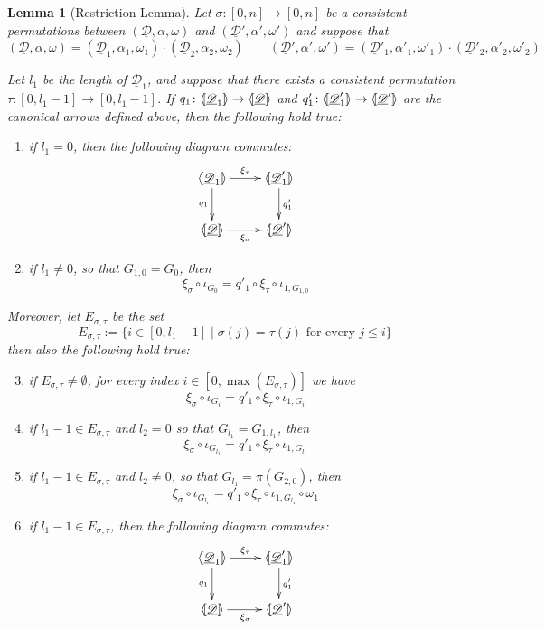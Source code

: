 \documentclass[a4paper]{article}
\newcommand{\dder}[1]{\mathscr{#1}}
\newcommand{\der}[1]{\underline{\dder{#1}}}
\newcommand{\lpro}{\langle \hspace{-1.85pt}[}
\newcommand{\rpro}{]\hspace{-1.85pt}\rangle}
\newtheorem{lemma}[theorem]{Lemma}
\theoremstyle{definition}
\begin{document}
\begin{lemma}[Restriction Lemma]\label{prop:uniqu}
	Let $\sigma\colon [0,n]\to [0,n]$ be a consistent permutations between $(\der{D}, \alpha, \omega)$ and $(\der{D}', \alpha', \omega')$ and suppose that 
	\[(\der{D}, \alpha, \omega)=(\der{D}_1, \alpha_1, \omega_1) \cdot (\der{D}_2, \alpha_2, \omega_2) \qquad (\der{D}', \alpha', \omega')=(\der{D}'_1, \alpha'_1, \omega'_1) \cdot (\der{D}'_2, \alpha'_2, \omega'_2) \]
	
	 Let $l_1$ be the length of $\der{D}_1$, and suppose that there exists a consistent permutation $\tau:[0,l_1-1]\to [0, l_1-1]$.  If $q_1\colon \lpro \der{D}_1\rpro \to \lpro \der{D}\rpro$  and $q'_1\colon \lpro \der{D}'_1\rpro \to \lpro \der{D}'\rpro$ are the canonical arrows defined above, then the following hold true:
	\begin{enumerate}
	\item  if $l_1=0$, then the following diagram commutes:
		\[\xymatrix{\lpro \der{D}_1\rpro \ar[r]^{\xi_\tau} \ar[d]_{q_1}& \lpro \der{D}'_1 \ar[d]^{q'_1}\rpro\\ \lpro \der{D}\rpro \ar[r]_{\xi_\sigma} & \lpro \der{D}'\rpro } \]
	\item if $l_1\neq 0$, so that $G_{1,0}=G_0$, then \[\xi_\sigma \circ \iota_{G_0} = q'_1\circ \xi_{\tau} \circ  \iota_{1, G_{1,0}}\]
	\end{enumerate}
	
	Moreover, let $E_{\sigma, \tau}$ be the set
	\[E_{\sigma, \tau}:=\{i\in  [0, l_1-1] \mid \sigma(j)=\tau(j) \text{ for every } j \leq i \}\]
	then also the following hold true:
	\begin{enumerate}
		\setcounter{enumi}{2}
	\item  if $E_{\sigma, \tau}\neq \emptyset$,  for every index $i\in [0, \max(E_{\sigma, \tau})]$ we have 
	\[\xi_\sigma \circ \iota_{G_i}=q'_1 \circ \xi_{\tau} \circ \iota_{1, G_i}\]
	\item if $l_1-1\in E_{\sigma, \tau}$ and $l_2=0$ so that  $G_{l_1}=G_{1, l_1}$, then 
	\[\xi_\sigma \circ \iota_{G_{l_1}}=q'_1 \circ \xi_{\tau} \circ \iota_{1, G_{l_1}}\]
	\item if $l_1-1\in E_{\sigma, \tau}$ and $l_2\neq 0$, so that $G_{l_1}=\pi(G_{2,0})$, then 
	\[\xi_\sigma \circ \iota_{G_{l_1}}=q'_1 \circ \xi_{\tau} \circ \iota_{1, G_{l_1}}\circ \omega_1 \]
	\item if $l_1-1\in E_{\sigma, \tau}$, then the following diagram commutes:
	\[\xymatrix{\lpro \der{D}_1\rpro \ar[r]^{\xi_\tau} \ar[d]_{q_1}& \lpro \der{D}'_1 \ar[d]^{q'_1}\rpro\\ \lpro \der{D}\rpro \ar[r]_{\xi_\sigma} & \lpro \der{D}'\rpro } \]
	\end{enumerate}
\end{lemma}
\end{document}
